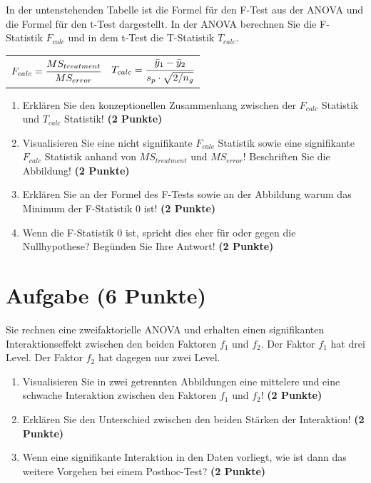 \documentclass[a4paper, 10pt]{scrartcl}\usepackage[]{graphicx}\usepackage[]{xcolor}
\begin{document}
In der untenstehenden Tabelle ist die Formel f{\"u}r den F-Test aus der ANOVA
und die Formel f{\"u}r den t-Test dargestellt. In der ANOVA berechnen Sie die
F-Statistik  $F_{calc}$ und in dem t-Test die T-Statistik  $T_{calc}$.

\begin{center}
  \begin{tabular}{cc}
    $F_{calc} = \cfrac{MS_{treatment}}{MS_{error}}$ & $T_{calc} = \cfrac{\bar{y}_1 - \bar{y}_2}{s_p \cdot \sqrt{2/n_g}}$\\
  \end{tabular}
\end{center}


\begin{enumerate}
\item Erkl{\"a}ren Sie den konzeptionellen Zusammenhang zwischen der $F_{calc}$
  Statistik und $T_{calc}$ Statistik! \textbf{(2 Punkte)}
\item Visualisieren Sie eine nicht signifikante $F_{calc}$ Statistik sowie
  eine signifikante $F_{calc}$ Statistik anhand von $MS_{treatment}$ und
  $MS_{error}$! Beschriften Sie die Abbildung! \textbf{(2 Punkte)}
\item Erkl{\"a}ren Sie an der Formel des F-Tests sowie an der Abbildung warum
  das Minimum der F-Statistik 0 ist! \textbf{(2 Punkte)}
\item Wenn die F-Statistik 0 ist, spricht dies eher f{\"u}r oder gegen die
  Nullhypothese? Beg{\"u}nden Sie Ihre Antwort! \textbf{(2 Punkte)}
\end{enumerate}

 
\clearpage

\section{Aufgabe \hfill (6 Punkte)}

Sie rechnen eine zweifaktorielle ANOVA und erhalten einen signifikanten
Interaktionseffekt zwischen den beiden Faktoren $f_1$ und $f_2$. Der Faktor
$f_1$ hat drei Level. Der Faktor $f_2$ hat dagegen nur zwei Level.




\begin{enumerate}
\item Visualisieren Sie in zwei getrennten Abbildungen eine
  mittelere und eine schwache Interaktion zwischen
  den Faktoren $f_1$ und $f_2$! \textbf{(2 Punkte)}
\item Erkl{\"a}ren Sie den Unterschied zwischen den beiden St{\"a}rken der Interaktion!
  \textbf{(2 Punkte)}
\item Wenn eine signifikante Interaktion in den Daten vorliegt, wie ist
  dann das weitere Vorgehen bei einem Posthoc-Test?
  \textbf{(2 Punkte)}
\end{enumerate}
\end{document}
